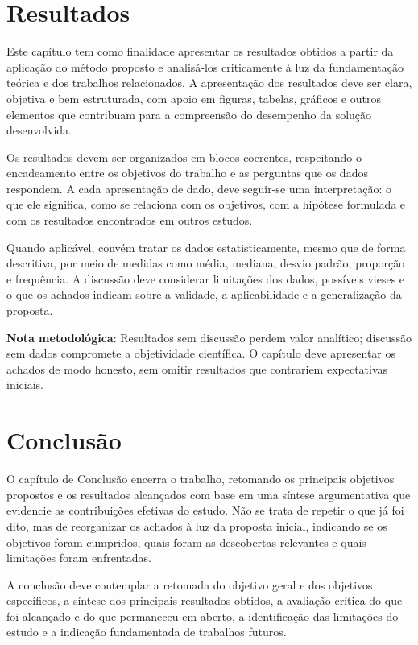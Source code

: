 \documentclass{eic-bcc-tcc}
\begin{document}
\chapter{Resultados}
\label{cha:resultados}

Este capítulo tem como finalidade apresentar os resultados obtidos a partir da aplicação do método proposto e analisá-los criticamente à luz da fundamentação teórica e dos trabalhos relacionados. A apresentação dos resultados deve ser clara, objetiva e bem estruturada, com apoio em figuras, tabelas, gráficos e outros elementos que contribuam para a compreensão do desempenho da solução desenvolvida.

Os resultados devem ser organizados em blocos coerentes, respeitando o encadeamento entre os objetivos do trabalho e as perguntas que os dados respondem. A cada apresentação de dado, deve seguir-se uma interpretação: o que ele significa, como se relaciona com os objetivos, com a hipótese formulada e com os resultados encontrados em outros estudos.

Quando aplicável, convém tratar os dados estatisticamente, mesmo que de forma descritiva, por meio de medidas como média, mediana, desvio padrão, proporção e frequência. A discussão deve considerar limitações dos dados, possíveis vieses e o que os achados indicam sobre a validade, a aplicabilidade e a generalização da proposta.

\textbf{Nota metodológica}: Resultados sem discussão perdem valor analítico; discussão sem dados compromete a objetividade científica. O capítulo deve apresentar os achados de modo honesto, sem omitir resultados que contrariem expectativas iniciais.


\chapter{Conclusão}
\label{cha:conclusao}

O capítulo de Conclusão encerra o trabalho, retomando os principais objetivos propostos e os resultados alcançados com base em uma síntese argumentativa que evidencie as contribuições efetivas do estudo. Não se trata de repetir o que já foi dito, mas de reorganizar os achados à luz da proposta inicial, indicando se os objetivos foram cumpridos, quais foram as descobertas relevantes e quais limitações foram enfrentadas.

A conclusão deve contemplar a retomada do objetivo geral e dos objetivos específicos, a síntese dos principais resultados obtidos, a avaliação crítica do que foi alcançado e do que permaneceu em aberto, a identificação das limitações do estudo e a indicação fundamentada de trabalhos futuros.
\end{document}
